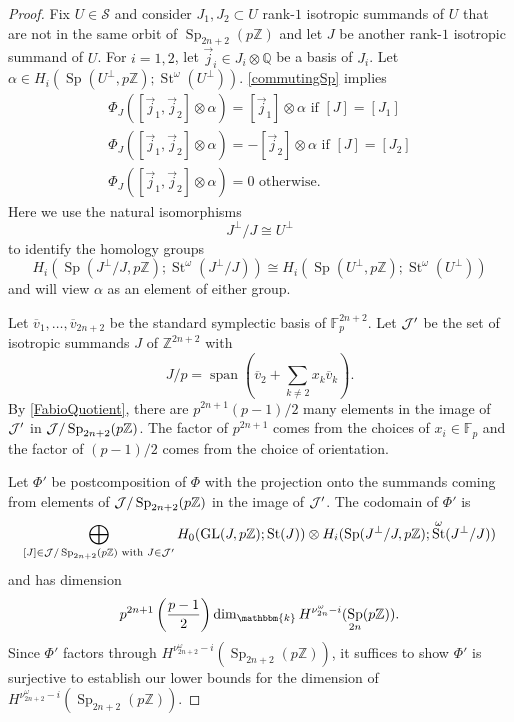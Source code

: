 \documentclass[11pt,letterpaper]{amsart}
\newcommand{\bk}{\mathbbm{k}}
\DeclareMathOperator{\Span}{span}
\DeclareMathOperator{\Sp}{Sp}
\newcommand{\cS}{\mathcal{S}}\newcommand{\cT}{\mathcal{T}}
\newcommand{\F}{\mathbb{F}}
\newcommand{\Z}{\mathbb{Z}}
\newcommand{\Q}{\mathbb{Q}}
\numberwithin{theoremcounter}{section}
\theoremstyle{definition}
\theoremstyle{remark}
\DeclareMathOperator{\GL}{GL}
\DeclareMathOperator{\St}{St}
\begin{document}
\begin{proof}
Fix $U \in \cS$ and consider $J_1, J_2 \subset U$ rank-$1$ isotropic summands of $U$ that are not in the same orbit of $\Sp_{2n+2}(p\Z)$ and let $J$ be another rank-$1$ isotropic summand of $U$. For $i=1,2$, let $\vec j_i \in J_i \otimes \Q$ be a basis of $J_i$. Let $\alpha \in H_i(\Sp(U^\perp,p\Z) ; \St^\omega(U^\perp)) $.
\autoref{commutingSp} implies 
\begin{equation}
\begin{split}
\Phi_{J}([\vec j_1,\vec j_2] \otimes \alpha) =[\vec j_1]\otimes \alpha \text{ if } [J]=[J_1] \\
\Phi_{J}([\vec j_1,\vec j_2] \otimes \alpha) = -[\vec j_2] \otimes \alpha  \text{ if } [J]=[J_2] \\
\Phi_{J}([\vec j_1,\vec j_2] \otimes \alpha) = 0  \text{ otherwise.}
\end{split}
\label{PhiJ}
\end{equation}
Here we use the natural isomorphisms $$J^\perp/J \cong U^\perp $$ to identify the homology groups $$H_i(\Sp( J^\perp/J,p\Z);\St^\omega(J^\perp/J))  \cong H_i(\Sp( U^\perp,p\Z);\St^\omega(U^\perp))$$ and will view $\alpha$ as an element of either group.

Let $\overline v_1,\ldots, \overline v_{2n+2}$ be the standard symplectic basis of $\F_{p}^{2n+2}$. 
Let $\mathcal{J}'$ be the set of isotropic summands $J$ of $\Z^{2n+2}$ with $$J/p =\Span(\overline v_2 + \sum_{k \neq 2} x_k \overline v_k).$$ 
By \autoref{FabioQuotient}, there are $p^{2n+1}(p-1)/2$ many elements in the image of $\mathcal{J}'$ in $\cJ/\Sp_{2n+2}(p\Z)$. The  factor of $p^{2n+1}$ comes from the choices of $x_i \in \F_p$ and the factor of $(p-1)/2$ comes from the choice of orientation. 

Let $\Phi'$ be postcomposition of $\Phi$ with the projection onto the summands coming from elements of $\cJ/\Sp_{2n+2}(p\Z)$ in the image of $\mathcal{J}'$. The codomain of $\Phi'$ is
$$\bigoplus_{[J] \in \cJ/\Sp_{2n+2}(p\Z)\text{ with } J \in \cJ'} H_0(\GL(J,p\Z) ; \St(J)) \otimes H_i(\Sp(J^\perp/J,p\Z); \St^\omega(J^\perp/J))$$ and
has dimension 
$$p^{2n+1}\left(\frac{p-1}{2}\right) \dim_\bk H^{\nu^\omega_{2n}-i}(\Sp_{2n}(p\Z)).$$ Since $\Phi'$ factors through $H^{\nu^\omega_{2n+2}-i}(\Sp_{2n+2}(p\Z))$, it suffices to show $\Phi'$ is surjective to establish our lower bounds for the dimension of $H^{\nu^\omega_{2n+2}-i}(\Sp_{2n+2}(p\Z))$. 


\end{proof}
\end{document}
